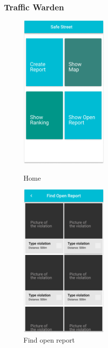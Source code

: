 \documentclass{article}
\begin{document}
\clearpage
\subsubsection{Traffic Warden}
\begin{figure}[!htb]
	\centering
	\begin{minipage}{.45\textwidth}
		\centering
		\includegraphics[height=7.7cm,keepaspectratio]{images/mockups/Home_Traffic_Warden.png}
		\caption{Home}
	\end{minipage}%
	\begin{minipage}{.45\textwidth}
		\centering
		\includegraphics[height=7.7cm,keepaspectratio]{images/mockups/Open_Report_Map.png}
		\caption{Find open report}
	\end{minipage}
\end{figure}
\end{document}
